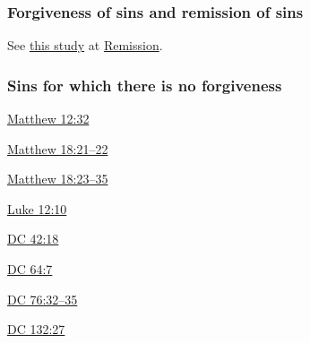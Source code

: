 	\subsubsection{Forgiveness of sins and remission of sins}
		
		See \hyperref[REMISSION-forgiveness]{this study} at \hyperref[REMISSION]{Remission}.
		
	\subsubsection{Sins for which there is no forgiveness}
		\label{FORGIVENESS-none}
		
		\begin{compactitem}
			\item \hyperref[MATTHEW-12-32]{Matthew 12:32}
			\item \hyperref[MATTHEW-18-21]{Matthew 18:21--22}
			\item \hyperref[MATTHEW-18-23]{Matthew 18:23--35}
			\item \hyperref[LUKE-12-10]{Luke 12:10}
			\item \hyperref[DC42-18]{DC 42:18}
			\item \hyperref[DC64-7]{DC 64:7}
			\item \hyperref[DC76-32]{DC 76:32--35}
			\item \hyperref[DC132-27]{DC 132:27}
		\end{compactitem}